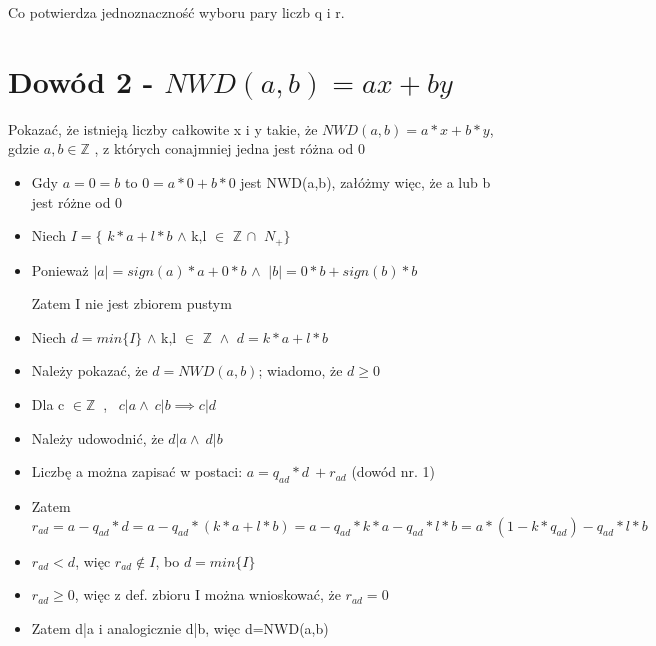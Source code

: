 \documentclass[a4paper, 12pt]{article}
\begin{document}
Co potwierdza jednoznaczność wyboru pary liczb q i r.

\section{Dowód 2 - \(NWD(a,b)=ax+by\)} 

Pokazać, że istnieją liczby całkowite x i y takie, że \(NWD(a,b)=a*x+b*y\), gdzie $a,b \in \mathbb{Z}$ , z których conajmniej jedna jest różna od 0 
\begin{itemize}

\item Gdy \(a=0=b\) to \(0=a*0+b*0\) jest NWD(a,b), załóżmy więc, że a lub b jest różne od 0

\item Niech \( I=\{ \) \(k*a+l*b\) \( \wedge \) k,l \(\in \) \(\mathbb{Z} \) \(\cap\ \) \(N_{+}\} \)

\item Ponieważ \(|a|= sign(a)*a+0*b\) \( \wedge\ \) \(|b|=0*b+sign(b)*b\) 

Zatem I nie jest zbiorem pustym

\item Niech \( d=min\{I\} \) \( \wedge \) k,l \( \in \) \(\mathbb{Z}\ \) \( \wedge\ \) \(d=k*a+l*b\)

\item Należy pokazać, że \(d=NWD(a,b)\); wiadomo, że \(d \geq 0\)

\item Dla c \(\in \mathbb{Z}\ \) , \ \(c|a \wedge\ c|b \implies c|d\)

\item Należy udowodnić, że \(d|a \wedge\ d|b\)

\item Liczbę a można zapisać w postaci: \(a= q_{ad}*d\ +   r_{ad}\) (dowód nr. 1)

\item Zatem \(r_{ad} = a - q_{ad} *d = a- q_{ad}*(k*a+l*b) = a-q_{ad}*k*a- q_{ad}*l*b = 
a*(1-k*q_{ad})- q_{ad}*l*b\)
\item \(r_{ad}<d\), więc \(r_{ad} \notin I \), bo \(d=min \{I\}\) 
\item \(r_{ad} \geq 0\), więc z def. zbioru I można wnioskować, że \(r_{ad} = 0\)
\item Zatem d|a i analogicznie d|b, więc d=NWD(a,b) 
\end{itemize}
\newpage
\end{document}
